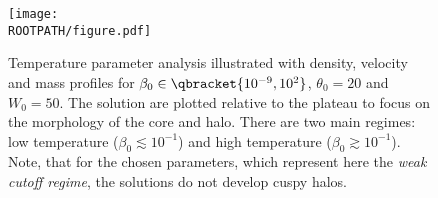 \begin{figure}%
	\centering%
	\texttt{[image: \\ROOTPATH/figure.pdf]}
	\caption{Temperature parameter analysis illustrated with density, velocity and mass profiles for $\beta_0\in\qbracket{10^{-9},10^{2}}$, $\theta_0 = 20$ and $W_0 = 50$. The solution are plotted relative to the plateau to focus on the morphology of the core and halo. There are two main regimes: low temperature  ($\beta_0 \lesssim 10^{-1}$) and high temperature ($\beta_0 \gtrsim 10^{-1}$). Note, that for the chosen parameters, which represent here the \textit{weak cutoff regime}, the solutions do not develop cuspy halos.}%
	\label{fig:profile:with-cutoff:beta0-weak:plat}%
\end{figure}